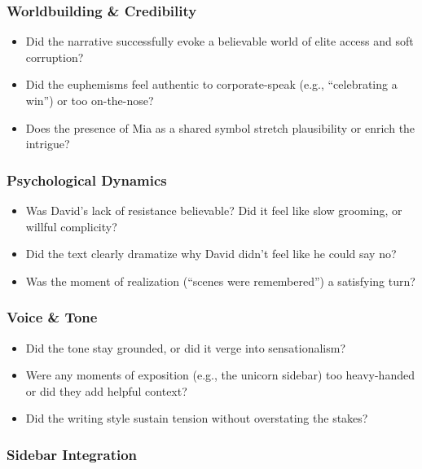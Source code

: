 \subsubsection*{Worldbuilding \& Credibility}

\begin{itemize}
  \item Did the narrative successfully evoke a believable world of elite access and soft corruption?
  \item Did the euphemisms feel authentic to corporate-speak (e.g., “celebrating a win”) or too on-the-nose?
  \item Does the presence of Mia as a shared symbol stretch plausibility or enrich the intrigue?
\end{itemize}

\subsubsection*{Psychological Dynamics}

\begin{itemize}
  \item Was David’s lack of resistance believable? Did it feel like slow grooming, or willful complicity?
  \item Did the text clearly dramatize why David didn’t feel like he could say no?
  \item Was the moment of realization (“scenes were remembered”) a satisfying turn?
\end{itemize}

\subsubsection*{Voice \& Tone}

\begin{itemize}
  \item Did the tone stay grounded, or did it verge into sensationalism?
  \item Were any moments of exposition (e.g., the unicorn sidebar) too heavy-handed or did they add helpful context?
  \item Did the writing style sustain tension without overstating the stakes?
\end{itemize}

\subsubsection*{Sidebar Integration}

